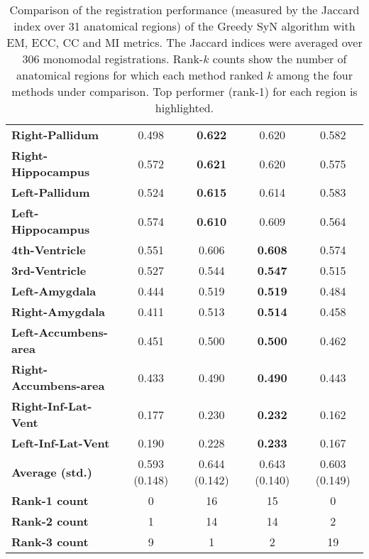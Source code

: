 \begin{table}[p]
{\begin{tabular}{lcccc}
    \textbf{Right-Pallidum} & 0.498 & \textbf{0.622} & 0.620 & 0.582 \\
    \textbf{Right-Hippocampus} & 0.572 & \textbf{0.621} & 0.620 & 0.575 \\
    \textbf{Left-Pallidum} & 0.524 & \textbf{0.615} & 0.614 & 0.583 \\
    \textbf{Left-Hippocampus} & 0.574 & \textbf{0.610} & 0.609 & 0.564 \\
    \textbf{4th-Ventricle} & 0.551 & 0.606 & \textbf{0.608} & 0.574 \\
    \textbf{3rd-Ventricle} & 0.527 & 0.544 & \textbf{0.547} & 0.515 \\
    \textbf{Left-Amygdala} & 0.444 & 0.519 & \textbf{0.519} & 0.484 \\
    \textbf{Right-Amygdala} & 0.411 & 0.513 & \textbf{0.514} & 0.458 \\
    \textbf{Left-Accumbens-area} & 0.451 & 0.500 & \textbf{0.500} & 0.462 \\
    \textbf{Right-Accumbens-area} & 0.433 & 0.490 & \textbf{0.490} & 0.443 \\
    \textbf{Right-Inf-Lat-Vent} & 0.177 & 0.230 & \textbf{0.232} & 0.162 \\
    \textbf{Left-Inf-Lat-Vent} & 0.190 & 0.228 & \textbf{0.233} & 0.167 \\
    \hline
    \textbf{Average (std.)} & 0.593 (0.148) & 0.644 (0.142) & 0.643 (0.140) & 0.603 (0.149) \\
    \textbf{Rank-1 count} & 0 & 16 & 15 & 0 \\
    \textbf{Rank-2 count} & 1 & 14 & 14 & 2 \\
    \textbf{Rank-3 count} & 9 & 1 & 2 & 19 \\
    \bottomrule
    \end{tabular}}%
    \caption{Comparison of the registration performance (measured by the Jaccard index over 31 anatomical regions) of the Greedy SyN algorithm with EM, ECC, CC and MI metrics.
The Jaccard indices were averaged over 306 monomodal registrations. Rank-$k$ counts show the number of anatomical regions for which each
method ranked $k$ among the four methods under comparison. Top performer (rank-1) for each region is highlighted. }
  \label{tab:monomodal_results_seg}%
\end{table}%
